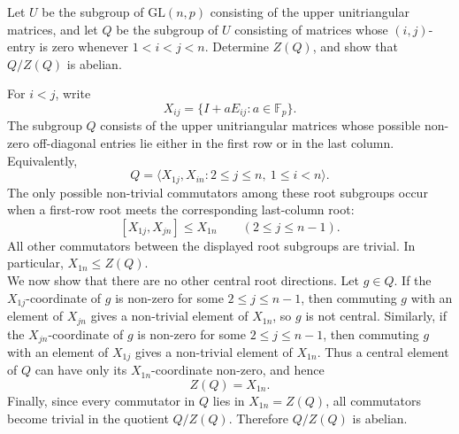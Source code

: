 \documentclass[../Odyssey_Project.tex]{subfiles}
\begin{document}
\begin{exercise}
\label{ex:8.4}
Let $U$ be the subgroup of $\mathrm{GL}(n,p)$ consisting of the upper unitriangular matrices, and let $Q$ be the subgroup of $U$ consisting of matrices whose $(i,j)$-entry is zero whenever $1 < i < j < n$. Determine $Z(Q)$, and show that $Q/Z(Q)$ is abelian.
\end{exercise}
\begin{solution}
For $i<j$, write
\[
    X_{ij}=\{I+aE_{ij}:a\in\mathbb{F}_p\}.
\]
The subgroup $Q$ consists of the upper unitriangular matrices whose possible non-zero off-diagonal entries lie either in the first row or in the last column. Equivalently,
\[
    Q=\langle X_{1j},X_{in}:2\leq j\leq n,\ 1\leq i<n\rangle.
\]
The only possible non-trivial commutators among these root subgroups occur when a first-row root meets the corresponding last-column root:
\[
    [X_{1j},X_{jn}]\leq X_{1n}
    \qquad (2\leq j\leq n-1).
\]
All other commutators between the displayed root subgroups are trivial. In particular, $X_{1n}\leq Z(Q)$.\\
We now show that there are no other central root directions. Let $g\in Q$. If the $X_{1j}$-coordinate of $g$ is non-zero for some $2\leq j\leq n-1$, then commuting $g$ with an element of $X_{jn}$ gives a non-trivial element of $X_{1n}$, so $g$ is not central. Similarly, if the $X_{jn}$-coordinate of $g$ is non-zero for some $2\leq j\leq n-1$, then commuting $g$ with an element of $X_{1j}$ gives a non-trivial element of $X_{1n}$. Thus a central element of $Q$ can have only its $X_{1n}$-coordinate non-zero, and hence
\[
    Z(Q)=X_{1n}.
\]
Finally, since every commutator in $Q$ lies in $X_{1n}=Z(Q)$, all commutators become trivial in the quotient $Q/Z(Q)$. Therefore $Q/Z(Q)$ is abelian.
\end{solution}
\end{document}
